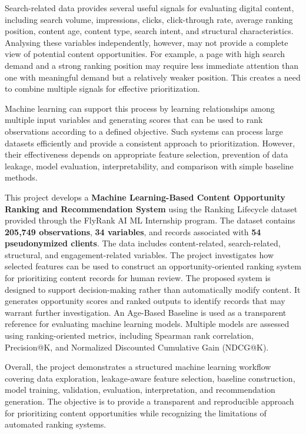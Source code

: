 \documentclass[12pt,a4paper]{report}
\begin{document}
Search-related data provides several useful signals for evaluating digital content, including search volume, impressions, clicks, click-through rate, average ranking position, content age, content type, search intent, and structural characteristics. Analysing these variables independently, however, may not provide a complete view of potential content opportunities. For example, a page with high search demand and a strong ranking position may require less immediate attention than one with meaningful demand but a relatively weaker position. This creates a need to combine multiple signals for effective prioritization.

Machine learning can support this process by learning relationships among multiple input variables and generating scores that can be used to rank observations according to a defined objective. Such systems can process large datasets efficiently and provide a consistent approach to prioritization. However, their effectiveness depends on appropriate feature selection, prevention of data leakage, model evaluation, interpretability, and comparison with simple baseline methods.

This project develops a \textbf{Machine Learning-Based Content Opportunity Ranking and Recommendation System} using the Ranking Lifecycle dataset provided through the FlyRank AI ML Internship program. The dataset contains \textbf{205,749 observations}, \textbf{34 variables}, and records associated with \textbf{54 pseudonymized clients}. The data includes content-related, search-related, structural, and engagement-related variables. The project investigates how selected features can be used to construct an opportunity-oriented ranking system for prioritizing content records for human review. The proposed system is designed to support decision-making rather than automatically modify content. It generates opportunity scores and ranked outputs to identify records that may warrant further investigation. An Age-Based Baseline is used as a transparent reference for evaluating machine learning models. Multiple models are assessed using ranking-oriented metrics, including Spearman rank correlation, Precision@K, and Normalized Discounted Cumulative Gain (NDCG@K).

Overall, the project demonstrates a structured machine learning workflow covering data exploration, leakage-aware feature selection, baseline construction, model training, validation, evaluation, interpretation, and recommendation generation. The objective is to provide a transparent and reproducible approach for prioritizing content opportunities while recognizing the limitations of automated ranking systems.
\end{document}
